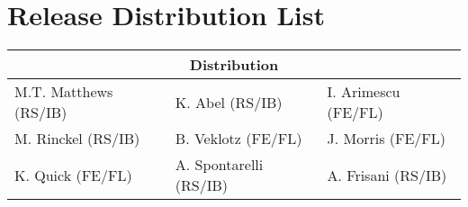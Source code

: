 \section{Release Distribution List}

\renewcommand{\arraystretch}{1.3}
\center

\begin{tabular}{|p{5.3cm}|p{5.3cm}|p{5.3cm}|}\hline
\multicolumn{3}{|c|}{\bf Distribution} \\\hline
M.T. Matthews (RS/IB) & K. Abel (RS/IB) & I. Arimescu (FE/FL) \\\hline
M. Rinckel (RS/IB) & B. Veklotz (FE/FL) & J. Morris (FE/FL) \\\hline
K. Quick (FE/FL) & A. Spontarelli (RS/IB) & A. Frisani (RS/IB) \\\hline
\end{tabular}
\\[3ex]